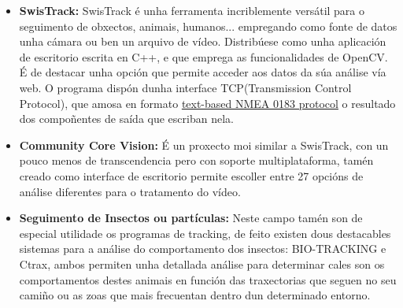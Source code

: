         \begin{itemize}
         \item \textbf{SwisTrack:}\cite{SwisTrack-webPage}
            SwisTrack é unha ferramenta incriblemente versátil para o seguimento de obxectos, 
            animais, humanos... empregando como fonte de datos unha cámara ou ben un arquivo de 
            vídeo. Distribúese como unha aplicación de escritorio escrita en C++, e que emprega as 
            funcionalidades de OpenCV.
            É de destacar unha opción que permite acceder aos datos da súa análise vía web. O 
            programa dispón dunha interface TCP(Transmission Control Protocol), que amosa en formato
            \underline{text-based NMEA 0183 protocol} o resultado dos compoñentes de saída que 
            escriban nela.
            
         \item \textbf{Community Core Vision:}\cite{ccv-webPage}
            É un proxecto moi similar a SwisTrack, con un pouco menos de transcendencia pero con 
            soporte multiplataforma, tamén creado como interface de escritorio permite escoller 
            entre 27 opcións de análise diferentes para o tratamento do vídeo.
            
        \item \textbf{Seguimento de Insectos ou partículas:}
            Neste campo tamén son de especial utilidade os programas de tracking, de feito existen 
            dous destacables sistemas para a análise do comportamento dos insectos: BIO-TRACKING
            \cite{bio-tracking-webPage} e Ctrax\cite{ctrax-webPage}, ambos permiten unha detallada
            análise para determinar cales son os comportamentos destes animais en función das
            traxectorias que seguen no seu camiño ou as zoas que mais frecuentan dentro dun
            determinado entorno.
        \end{itemize}
